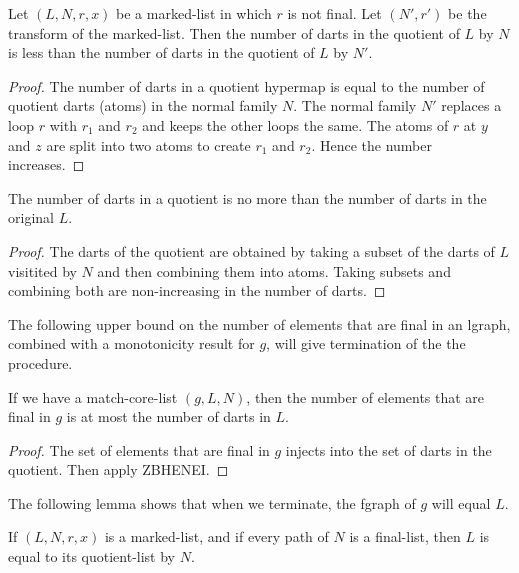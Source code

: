 \begin{lemma}  Let $(L,N,r,x)$ be a marked-list in which $r$ is not final.
Let $(N',r')$ be the transform of the marked-list.  Then the number of darts in the
quotient of $L$ by $N$ is less than the number of darts in the quotient of $L$ by $N'$.
\end{lemma}

\begin{proof}  The number of darts in a quotient hypermap is equal
to the number of quotient darts (atoms) in the normal family $N$.
The normal family $N'$ replaces a loop $r$ with $r_1$ and $r_2$
and keeps the other loops the same.  The atoms of $r$ at
$y$ and $z$ are split into two atoms to create $r_1$ and $r_2$.
Hence the number increases.
\end{proof}


\begin{lemma}  The number of darts in a quotient is no more than
the number of darts in the original $L$.
\end{lemma}

\begin{proof} The darts of the quotient  are obtained by taking a subset
of the darts of $L$ visitited by $N$ and then combining them into
atoms.  Taking subsets and combining both are non-increasing
in the number of darts.  
\end{proof}

The following upper bound on the number of elements that are final in 
an lgraph, combined with a monotonicity result for $g$, will give termination
of the the procedure.

\begin{lemma} If we have a match-core-list $(g,L,N)$,
then the number of elements that are final in $g$ is at most the number
of darts in $L$.
\end{lemma}

\begin{proof}  The set of elements that are final in $g$ injects into the
set of darts in the quotient.  Then apply ZBHENEI.
\end{proof}

The following lemma shows that when we terminate, the fgraph of $g$
will equal $L$.

\begin{lemma} If $(L,N,r,x)$ is a marked-list, 
and if every path of $N$
is a final-list, then $L$ is equal to its quotient-list by $N$.
\end{lemma}

